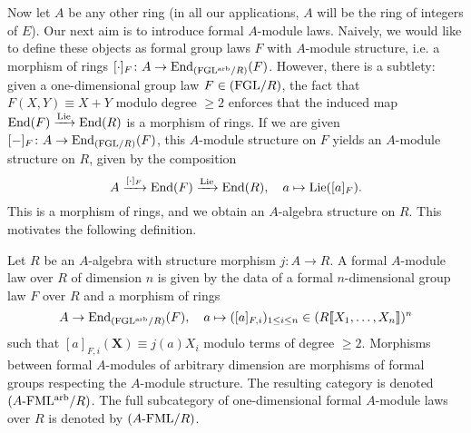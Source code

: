 \documentclass[../main.tex]{subfiles}
\begin{document}
Now let $A$ be any other ring (in all our applications, $A$ will be the ring
of integers of $E$). Our next aim is to introduce formal $A$-module
laws. Naively, we would like to define these objects as formal group laws $F$
with $A$-module structure, i.e. a morphism of rings $[\cdot]_F\colon A \to
\operatorname{End}_{(\mathrm{FGL^{arb}}/{R})}(F)$. However, there is a subtlety: given a one-dimensional
group law $F \in {(\mathrm{FGL}/{R})}$, the fact that $F(X,Y) \equiv X+Y$ modulo degree $\geq 2$
enforces that the induced map $\operatorname{End}(F) \xrightarrow{\operatorname{Lie}} \operatorname{End}(R)$ is a morphism of rings. 
If we are given $[-]_F\colon  A \to \operatorname{End}_{{(\mathrm{FGL}/{R})}}(F)$, this $A$-module structure on $F$ 
yields an $A$-module structure on $R$, given by the composition
\begin{equation*}
  A \xrightarrow{[\cdot]_F} \operatorname{End}(F) \xrightarrow{\operatorname{Lie}} \operatorname{End}(R), \quad a \mapsto \operatorname{Lie}([a]_F).
\end{equation*}
This is a morphism of rings, and we obtain an $A$-algebra structure on $R$. 
This motivates the following definition.
\begin{defi}\label{def:formalmodulelaw}
  Let $R$ be an $A$-algebra with structure morphism $j\colon  A \to R$. A formal
  $A$-module law over $R$ of dimension $n$ is given by the data of 
  a formal $n$-dimensional group law $F$ over $R$ and a morphism of rings
  \begin{equation*}
    A \to \operatorname{End}_{{(\mathrm{FGL^{arb}}/{R})}} (F), \quad a \mapsto ([a]_{F,i}
    )_{1 \leq i \leq n} \in (R \llbracket X_1, \dots, X_n \rrbracket )^n
  \end{equation*}
  such that $[a]_{F,i}(\mathbf X) \equiv j(a) X_i$ modulo terms of degree 
  $\geq 2$. Morphisms between formal $A$-modules of arbitrary dimension are 
  morphisms of formal groups respecting the $A$-module structure. 
  The resulting category is denoted ${({A}\textnormal-\allowbreak\mathrm{FML^{arb}}/{R})}$. The full
  subcategory of one-dimensional formal $A$-module laws over $R$ is denoted 
  by ${({A}\textnormal-\allowbreak\mathrm{FML}/{R})}$.
\end{defi}
\end{document}
